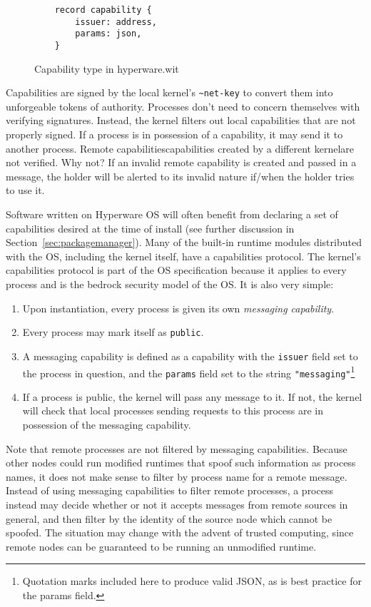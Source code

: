 \documentclass[runningheads]{llncs}
\begin{document}
\begin{figure}[H]
    \centering
    \begin{verbatim}
    record capability {
        issuer: address,
        params: json,
    }
    \end{verbatim}
    \caption{Capability type in hyperware.wit}
    \label{fig:WIT Types 3}
\end{figure}

Capabilities are signed by the local kernel's \verb|~net-key| to convert them into unforgeable tokens of authority.
Processes don't need to concern themselves with verifying signatures.
Instead, the kernel filters out local capabilities that are not properly signed.
If a process is in possession of a capability, it may send it to another process.
Remote capabilities\textemdash capabilities created by a different kernel\textemdash are not verified.
Why not?
If an invalid remote capability is created and passed in a message, the holder will be alerted to its invalid nature if/when the holder tries to use it.

Software written on Hyperware OS will often benefit from declaring a set of capabilities desired at the time of install (see further discussion in Section~\ref{sec:packagemanager}).
Many of the built-in runtime modules distributed with the OS, including the kernel itself, have a capabilities protocol.
The kernel's capabilities protocol is part of the OS specification because it applies to every process and is the bedrock security model of the OS.
It is also very simple:
\begin{enumerate}
    \item Upon instantiation, every process is given its own \textit{messaging capability}.
    \item Every process may mark itself as \verb|public|.
    \item A messaging capability is defined as a capability with the \verb|issuer| field set to the process in question, and the \verb|params| field set to the string \verb|"messaging"|\footnote{Quotation marks included here to produce valid JSON, as is best practice for the params field.}
    \item If a process is public, the kernel will pass any message to it. If not, the kernel will check that local processes sending requests to this process are in possession of the messaging capability.
\end{enumerate}

Note that remote processes are not filtered by messaging capabilities.
Because other nodes could run modified runtimes that spoof such information as process names, it does not make sense to filter by process name for a remote message.
Instead of using messaging capabilities to filter remote processes, a process instead may decide whether or not it accepts messages from remote sources in general, and then filter by the identity of the source node which cannot be spoofed.
The situation may change with the advent of trusted computing, since remote nodes can be guaranteed to be running an unmodified runtime.
\end{document}
